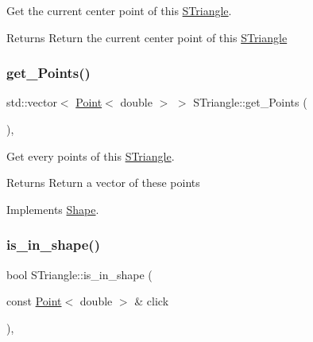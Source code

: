 Get the current center point of this \hyperlink{classSTriangle}{S\+Triangle}. 

\begin{DoxyReturn}{Returns}
Return the current center point of this \hyperlink{classSTriangle}{S\+Triangle} 
\end{DoxyReturn}
\mbox{\label{classSTriangle_a08f667453619b506b5c16745a9aa5ecf}} 
\subsubsection{\texorpdfstring{get\+\_\+\+Points()}{get\_Points()}}
{\footnotesize\ttfamily std\+::vector$<$ \hyperlink{classPoint}{Point}$<$ double $>$ $>$ S\+Triangle\+::get\+\_\+\+Points (\begin{DoxyParamCaption}{ }\end{DoxyParamCaption})\hspace{0.3cm}{\ttfamily [override]}, {\ttfamily [virtual]}}



Get every points of this \hyperlink{classSTriangle}{S\+Triangle}. 

\begin{DoxyReturn}{Returns}
Return a vector of these points 
\end{DoxyReturn}


Implements \hyperlink{classShape_add74a5c682840fa4a519242b1ddbd0b5}{Shape}.

\mbox{\label{classSTriangle_a5b55df6eb4af922521da69f69df77b42}} 
\subsubsection{\texorpdfstring{is\+\_\+in\+\_\+shape()}{is\_in\_shape()}}
{\footnotesize\ttfamily bool S\+Triangle\+::is\+\_\+in\+\_\+shape (\begin{DoxyParamCaption}\item[{const \hyperlink{classPoint}{Point}$<$ double $>$ \&}]{click }\end{DoxyParamCaption})\hspace{0.3cm}{\ttfamily [override]}, {\ttfamily [virtual]}}



